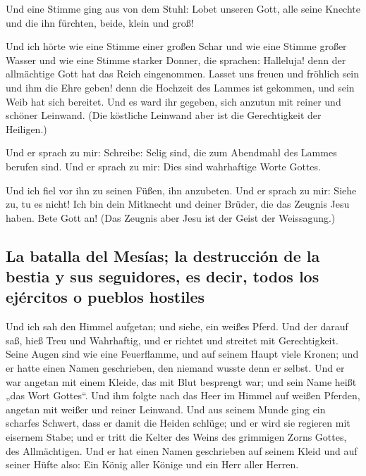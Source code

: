  Und eine Stimme ging aus von dem Stuhl: Lobet unseren
Gott, alle seine Knechte und die ihn fürchten, beide, klein und groß!

 Und ich hörte wie eine Stimme einer großen Schar und wie
eine Stimme großer Wasser und wie eine Stimme starker Donner, die
sprachen: Halleluja! denn der allmächtige Gott hat das Reich
eingenommen.  Lasset uns freuen und fröhlich sein und ihm
die Ehre geben! denn die Hochzeit des Lammes ist gekommen, und sein Weib
hat sich bereitet.  Und es ward ihr gegeben, sich anzutun
mit reiner und schöner Leinwand. (Die köstliche Leinwand aber ist die
Gerechtigkeit der Heiligen.)

 Und er sprach zu mir: Schreibe: Selig sind, die zum
Abendmahl des Lammes berufen sind. Und er sprach zu mir: Dies sind
wahrhaftige Worte Gottes.

 Und ich fiel vor ihn zu seinen Füßen, ihn anzubeten. Und
er sprach zu mir: Siehe zu, tu es nicht! Ich bin dein Mitknecht und
deiner Brüder, die das Zeugnis Jesu haben. Bete Gott an! (Das Zeugnis
aber Jesu ist der Geist der Weissagung.)

\hypertarget{la-batalla-del-mesuxedas-la-destrucciuxf3n-de-la-bestia-y-sus-seguidores-es-decir-todos-los-ejuxe9rcitos-o-pueblos-hostiles}{%
\subsection{La batalla del Mesías; la destrucción de la bestia y sus
seguidores, es decir, todos los ejércitos o pueblos
hostiles}\label{la-batalla-del-mesuxedas-la-destrucciuxf3n-de-la-bestia-y-sus-seguidores-es-decir-todos-los-ejuxe9rcitos-o-pueblos-hostiles}}

 Und ich sah den Himmel aufgetan; und siehe, ein weißes
Pferd. Und der darauf saß, hieß Treu und Wahrhaftig, und er richtet und
streitet mit Gerechtigkeit.  Seine Augen sind wie eine
Feuerflamme, und auf seinem Haupt viele Kronen; und er hatte einen Namen
geschrieben, den niemand wusste denn er selbst.  Und er
war angetan mit einem Kleide, das mit Blut besprengt war; und sein Name
heißt „das Wort Gottes``.  Und ihm folgte nach das Heer
im Himmel auf weißen Pferden, angetan mit weißer und reiner Leinwand.
 Und aus seinem Munde ging ein scharfes Schwert, dass er
damit die Heiden schlüge; und er wird sie regieren mit eisernem Stabe;
und er tritt die Kelter des Weins des grimmigen Zorns Gottes, des
Allmächtigen.  Und er hat einen Namen geschrieben auf
seinem Kleid und auf seiner Hüfte also: Ein König aller Könige und ein
Herr aller Herren.

